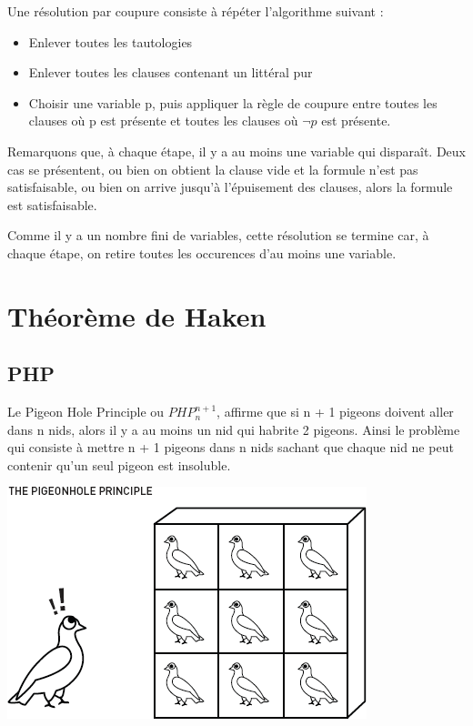\documentclass[12pt]{extarticle}
\begin{document}
Une résolution par coupure consiste à répéter l'algorithme suivant :

\begin{itemize}
    \item Enlever toutes les tautologies
    \item Enlever toutes les clauses contenant un littéral pur
    \item Choisir une variable p, puis appliquer la règle de coupure entre toutes les clauses où p est présente et toutes les clauses où $\lnot{p}$ est présente.
\end{itemize}

Remarquons que, à chaque étape, il y a au moins une variable qui disparaît. Deux cas se présentent, ou bien on obtient la clause vide et la formule n'est pas satisfaisable, ou bien on arrive jusqu'à l'épuisement des clauses, alors la formule est satisfaisable.

Comme il y a un nombre fini de variables, cette résolution se termine car, à chaque étape, on retire toutes les occurences d'au moins une variable.

\newpage
\section{Théorème de Haken}

\subsection{PHP}

Le Pigeon Hole Principle ou $PHP_n^{n + 1}$, affirme que si n + 1 pigeons doivent aller dans n nids, alors il y a au moins un nid qui habrite 2 pigeons. Ainsi le problème qui consiste à mettre n + 1 pigeons dans n nids sachant que chaque nid ne peut contenir qu'un seul pigeon est insoluble.

\vspace{2em}

\includegraphics[]{pigeonhole-principle1.png}
\end{document}
